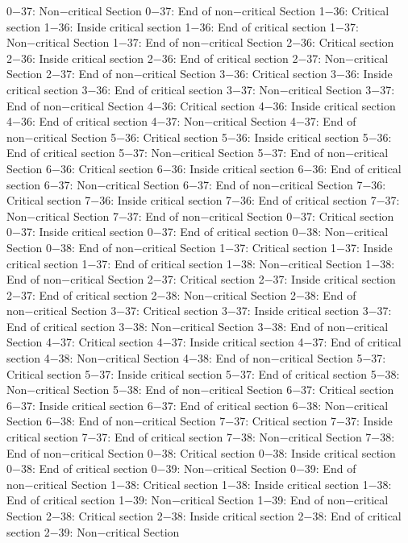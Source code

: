 0−37: Non−critical Section
0−37: End of non−critical Section
1−36: Critical section
1−36: Inside critical section
1−36: End of critical section
1−37: Non−critical Section
1−37: End of non−critical Section
2−36: Critical section
2−36: Inside critical section
2−36: End of critical section
2−37: Non−critical Section
2−37: End of non−critical Section
3−36: Critical section
3−36: Inside critical section
3−36: End of critical section
3−37: Non−critical Section
3−37: End of non−critical Section
4−36: Critical section
4−36: Inside critical section
4−36: End of critical section
4−37: Non−critical Section
4−37: End of non−critical Section
5−36: Critical section
5−36: Inside critical section
5−36: End of critical section
5−37: Non−critical Section
5−37: End of non−critical Section
6−36: Critical section
6−36: Inside critical section
6−36: End of critical section
6−37: Non−critical Section
6−37: End of non−critical Section
7−36: Critical section
7−36: Inside critical section
7−36: End of critical section
7−37: Non−critical Section
7−37: End of non−critical Section
0−37: Critical section
0−37: Inside critical section
0−37: End of critical section
0−38: Non−critical Section
0−38: End of non−critical Section
1−37: Critical section
1−37: Inside critical section
1−37: End of critical section
1−38: Non−critical Section
1−38: End of non−critical Section
2−37: Critical section
2−37: Inside critical section
2−37: End of critical section
2−38: Non−critical Section
2−38: End of non−critical Section
3−37: Critical section
3−37: Inside critical section
3−37: End of critical section
3−38: Non−critical Section
3−38: End of non−critical Section
4−37: Critical section
4−37: Inside critical section
4−37: End of critical section
4−38: Non−critical Section
4−38: End of non−critical Section
5−37: Critical section
5−37: Inside critical section
5−37: End of critical section
5−38: Non−critical Section
5−38: End of non−critical Section
6−37: Critical section
6−37: Inside critical section
6−37: End of critical section
6−38: Non−critical Section
6−38: End of non−critical Section
7−37: Critical section
7−37: Inside critical section
7−37: End of critical section
7−38: Non−critical Section
7−38: End of non−critical Section
0−38: Critical section
0−38: Inside critical section
0−38: End of critical section
0−39: Non−critical Section
0−39: End of non−critical Section
1−38: Critical section
1−38: Inside critical section
1−38: End of critical section
1−39: Non−critical Section
1−39: End of non−critical Section
2−38: Critical section
2−38: Inside critical section
2−38: End of critical section
2−39: Non−critical Section
